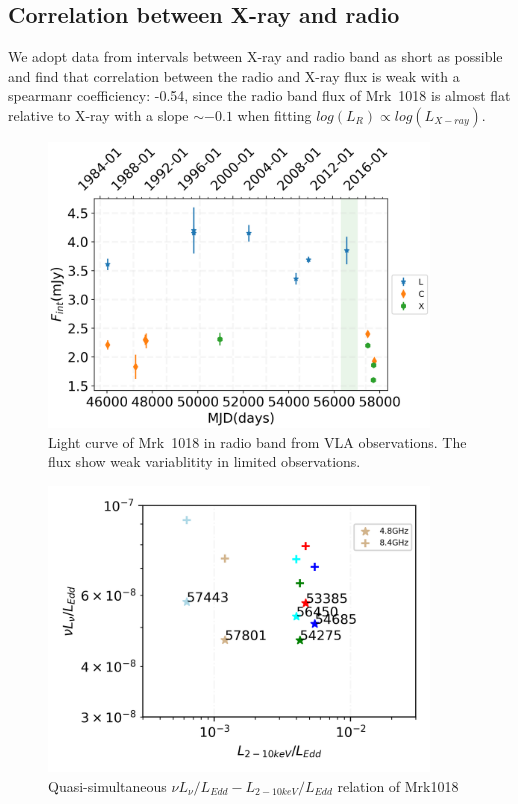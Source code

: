 \documentclass{aastex63}
\begin{document}
\subsection{Correlation between X-ray and radio}\label{subsec:xray-radio}
We adopt data from intervals between X-ray and radio band as short as possible and find that correlation between the radio and X-ray flux is weak with a spearmanr coefficiency: -0.54, since the radio band flux of Mrk~1018 is almost flat relative to X-ray with a slope $\sim -0.1$ when fitting $log(L_{R})\propto log(L_{X-ray})$. 


\begin{figure}
\centering
	\includegraphics[width=0.9\textwidth]{./pic/radio-date-lc.png}
    \caption{Light curve of Mrk~1018 in radio band from VLA observations. The flux show weak variablitity in limited observations. }
    \label{fig:radio-lc}
\end{figure}


\begin{figure}
\centering
	\includegraphics[width=0.9\textwidth]{./pic/Mrk1018_radio_xray_sel1_rate.png}
    \caption{Quasi-simultaneous $\nu L_{\nu}/L_{Edd}-L_{2-10keV}/L_{Edd}$ relation of Mrk1018}
    \label{fig:radio-xray-relation}
\end{figure}
\end{document}
